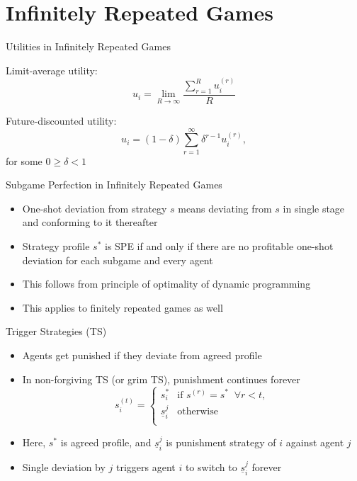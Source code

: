 \documentclass[11pt,aspectratio=169]{beamer}
\begin{document}
 \section{Infinitely Repeated Games}
 
  \begin{frame}{Utilities in Infinitely Repeated Games}
   \begin{itemizes}[2em]
    \item \alert{Limit-average utility}: 
    $$u_i = \lim_{R\rightarrow\infty}\frac{\sum_{r=1}^{R}u_i^{(r)}}{R}$$
    \item \alert{Future-discounted utility}: 
    $$u_i = (1 - \delta) \sum_{r=1}^{\infty}\delta^{r-1} u_i^{(r)},$$
    for some $0 \ge \delta < 1$
   \end{itemizes}
  \end{frame}
  
  
  \begin{frame}{Subgame Perfection in Infinitely Repeated Games}
   \begin{itemize}
   \setlength{\itemsep}{2em}
    \item \alert{One-shot deviation} from strategy $s$ means deviating from $s$ in single stage and conforming to it thereafter
    \item Strategy profile $s^*$ is SPE \alert{if and only if} there are no \alert{profitable} one-shot deviation for \alert{each subgame} and \alert{every agent}
    \item This follows from principle of optimality of \alert{dynamic programming}
    \item This applies to finitely repeated games as well
   \end{itemize}
  \end{frame}

  \begin{frame}{Trigger Strategies (TS)}
   \begin{itemize}
    \item Agents get \alert{punished} if they deviate from agreed profile
    \item In \alert{non-forgiving} TS (or grim TS), punishment continues forever
    $$ 
    s_i^{(t)}=\begin{cases}
                  s_i^* &\text{if } s^{(r)} = s^* \;\; \forall r<t,\\
                  \underline{s}_{i}^{j} &\text{otherwise}\\
                 \end{cases}
    $$
    \item Here, $s^{*}$ is agreed profile, and $\underline{s}_{i}^{j}$ is punishment strategy of $i$ against agent $j$
    \item Single deviation by $j$ triggers agent $i$ to switch to $\underline{s}_{i}^{j}$ \alert{forever}
   \end{itemize}
  \end{frame}
\end{document}
